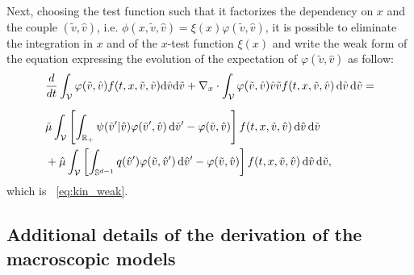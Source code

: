 \documentclass[a4paper]{article}
\theoremstyle{Theorem}\newtheorem{proposition}{Proposition}[section]
\theoremstyle{Remark}\newtheorem{remark}{Remark}[section]
\theoremstyle{Theorem}\newtheorem{theorem}{Theorem}[section]
\newcommand{\R}{\mathbb{R}}
\newcommand{\hv}{\hat{v}}
\newcommand{\tv}{\tilde{v}}
\newcommand{\hmu}{\hat{\mu}}
\newcommand{\tmu}{\tilde{\mu}}
\newcommand{\intS}{\int_{\mathbb{S}^{d-1}}}
\newcommand{\intR}{\int_{\R_+}}
\newcommand{\intV}{\int_{\mathcal{V}}}
\begin{document}
Next, choosing the test function such that it factorizes the dependency on $x$ and the couple $(\tv,\hv)$, i.e. $\phi(x,\tv,\hv)=\xi(x) \varphi(\tv,\hv)$, it is possible to eliminate the integration in $x$ and of the $x$-test function $\xi(x)$ and write the weak form of the equation expressing the evolution of the expectation of $\varphi(\tv,\hv)$ as follow:
\begin{equation*}
\begin{aligned}[b]
&\dfrac{d}{dt}\intV\varphi(\tv,\hv) f(t,x,\tv,\hv) {\rm d}\hv {\rm d}\tv+\nabla_x \cdot \intV\varphi(\tv,\hv) \hv\tv f(t,x,\tv,\hv) \, {\rm d}\hv \, {\rm d}\tv=\\[0.2cm]
& \tmu\intV\left[\intR\psi(\tv'|\hv)\varphi(\tv',\hv)\, {\rm d}\tv'-\varphi(\tv,\hv)\right]f(t,x,\tv,\hv) \,{\rm d}\hv \, {\rm d}\tv\\
&+\hmu\intV\left[\intS q(\hv')\varphi(\tv,\hv')\, {\rm d}\hv'-\varphi(\tv,\hv)\right]f(t,x,\tv,\hv) \,{\rm d}\hv \, {\rm d}\tv,
\end{aligned}
\end{equation*}
which is ~\eqref{eq:kin_weak}.



\subsection{Additional details of the derivation of the macroscopic models}\label{appendix2}
\end{document}
